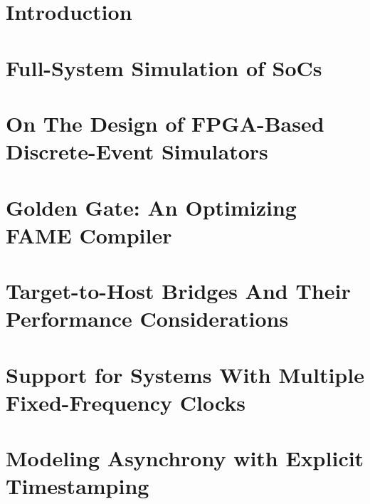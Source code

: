 \documentclass[phd]{ucbthesis}
\begin{document}
\chapter{Introduction}

%

%
%

\chapter{Full-System Simulation of SoCs}



\chapter{On The Design of FPGA-Based Discrete-Event Simulators}\label{ch:fpga-des}

\label{sec:fpga-des}

\chapter{Golden Gate: An Optimizing FAME Compiler}\label{sec:golden-gate}



\chapter{Target-to-Host Bridges And Their Performance Considerations}\label{sec:bridges}



\chapter{Support for Systems With Multiple Fixed-Frequency Clocks}\label{sec:static-multiclock}



\chapter{Modeling Asynchrony with Explicit Timestamping}\label{sec:dynamic-multiclock}



%

\printbibliography
\end{document}
